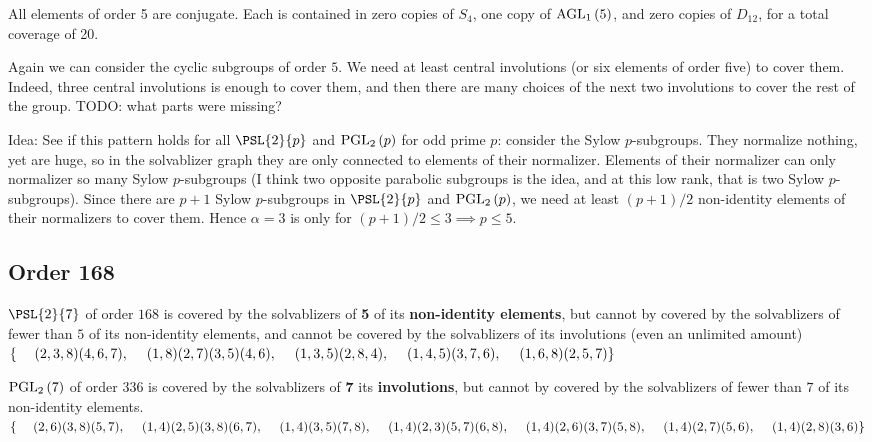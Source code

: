 \documentclass[12pt]{amsart}
\begin{document}
All elements of order 5 are conjugate. Each is contained in zero copies
of $S_4$, one copy of $\operatorname{AGL}_{1}\left(5\right)$, and zero copies of $D_{12}$, for
a total coverage of 20.

Again we can consider the cyclic subgroups of order $5$. We need
at least central involutions (or six elements of order five) to
cover them. Indeed, three central involutions is enough to cover them,
and then there are many choices of the next two involutions to cover
the rest of the group. TODO: what parts were missing?

Idea: See if this pattern holds for all $\PSL{2}{p}$ and $\operatorname{PGL}_{2}\left(p\right)$
for odd prime $p$: consider the Sylow $p$-subgroups. They normalize
nothing, yet are huge, so in the solvablizer graph they are
only connected to elements of their normalizer. Elements of their
normalizer can only normalizer so many Sylow $p$-subgroups (I think
two opposite parabolic subgroups is the idea, and at this low rank,
that is two Sylow $p$-subgroups). Since there are $p+1$ Sylow $p$-subgroups
in $\PSL{2}{p}$ and $\operatorname{PGL}_{2}\left(p\right)$, we need at least $(p+1)/2$ non-identity
elements of their normalizers to cover them. Hence $\alpha = 3$ is only
for $(p+1)/2 \leq 3 \implies p \leq 5$.

\subsection{Order 168}

$\PSL{2}{7}$ of order $168$ is covered by the solvablizers of \textbf{5}
of its \textbf{non-identity elements}, but cannot by covered by the
solvablizers of fewer than $5$ of its non-identity elements, and cannot
be covered by the solvablizers of its involutions (even an unlimited amount) \\
{\tiny $\{ \\
\phantom. \quad (2,3,8)(4,6,7), \\
\phantom. \quad (1,8)(2,7)(3,5)(4,6),  \\
\phantom. \quad (1,3,5)(2,8,4), \\
\phantom. \quad (1,4,5)(3,7,6), \\
\phantom. \quad (1,6,8)(2,5,7) \\
\}$ }

$\operatorname{PGL}_{2}\left(7\right)$ of order $336$ is covered by the solvablizers of \textbf{7}
its \textbf{involutions}, but cannot by covered by the solvablizers of
fewer than $7$ of its non-identity elements. \\
{\tiny $\{ \\
\phantom. \quad (2,6)(3,8)(5,7), \\
\phantom. \quad (1,4)(2,5)(3,8)(6,7), \\
\phantom. \quad (1,4)(3,5)(7,8), \\
\phantom. \quad (1,4)(2,3)(5,7)(6,8), \\
\phantom. \quad (1,4)(2,6)(3,7)(5,8), \\
\phantom. \quad (1,4)(2,7)(5,6), \\
\phantom. \quad (1,4)(2,8)(3,6) \\
\}$ }
\end{document}
